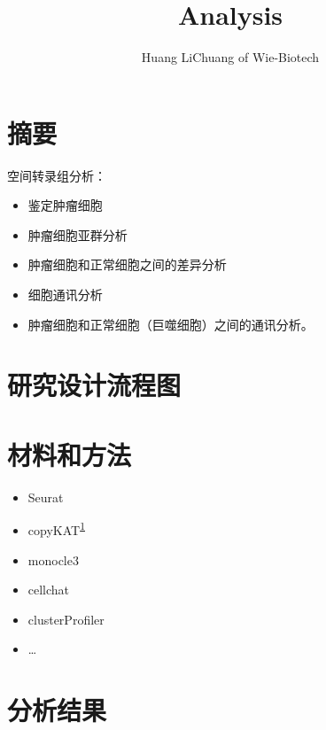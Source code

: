\documentclass[
]{article}
\title{Analysis}
\author{Huang LiChuang of Wie-Biotech}
\date{}
\providecommand{\tightlist}{%
  \setlength{\itemsep}{0pt}\setlength{\parskip}{0pt}}
\begin{document}
\maketitle

{
\setcounter{tocdepth}{3}
\tableofcontents
}
\listoffigures

\listoftables

\hypertarget{abstract}{%
\section{摘要}\label{abstract}}

空间转录组分析：

\begin{itemize}
\tightlist
\item
  鉴定肿瘤细胞
\item
  肿瘤细胞亚群分析
\item
  肿瘤细胞和正常细胞之间的差异分析
\item
  细胞通讯分析
\item
  肿瘤细胞和正常细胞（巨噬细胞）之间的通讯分析。
\end{itemize}

\hypertarget{route}{%
\section{研究设计流程图}\label{route}}

\hypertarget{methods}{%
\section{材料和方法}\label{methods}}

\begin{itemize}
\tightlist
\item
  Seurat
\item
  copyKAT\textsuperscript{\protect\hyperlink{ref-DelineatingCopGaoR2021}{1}}
\item
  monocle3
\item
  cellchat
\item
  clusterProfiler
\item
  \ldots{}
\end{itemize}

\hypertarget{results}{%
\section{分析结果}\label{results}}
\end{document}
